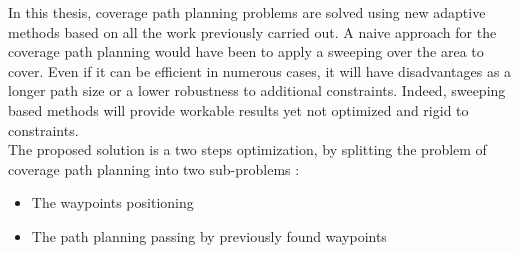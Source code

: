 
%

In this thesis, coverage path planning problems are solved using new adaptive methods based on all the work previously carried out.
A naive approach for the coverage path planning would have been to apply a sweeping over the area to cover. Even if it can be efficient in numerous cases, it will have disadvantages as a longer path size or a lower robustness to additional constraints. Indeed, sweeping based methods will provide workable results yet not optimized and rigid to constraints. \\
The proposed solution is a two steps optimization, by splitting the problem of coverage path planning into two sub-problems : 
\begin{itemize}
\item The waypoints positioning 
\item The path planning passing by previously found waypoints
\end{itemize} 

